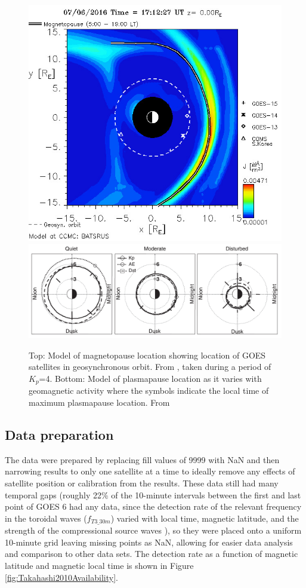 \begin{figure}[htp!]
	\centering
	\includegraphics[width=0.9\linewidth]{Figures/iSWACygnetStreamer.jpg}
	\includegraphics[width=0.9\linewidth]{Figures/PlasmapauseLocation.png}
	\caption{Top: Model of magnetopause location showing location of GOES satellites in geosynchronous orbit. From \citep{CCMC}, taken during a period of $K_p$=4. Bottom: Model of plasmapause location as it varies with geomagnetic activity where the symbols indicate the local time of maximum plasmapause location. From \citep{OBrien2003EmpiricalPlasmapause}}
	\label{fig:PlasmapauseLocation}
\end{figure}

\subsection{Data preparation}
The data were prepared by replacing fill values of 9999 with NaN and then narrowing results to only one satellite at a time to ideally remove any effects of satellite position or calibration from the results. These data still had many temporal gaps (roughly 22\% of the 10-minute intervals between the first and last point of GOES 6 had any data, since the detection rate of the relevant frequency in the toroidal waves ($f_{T3\_30m}$) varied with local time, magnetic latitude, and the strength of the compressional source waves \citep{Takahashi2010SolarCycleVariation}), so they were placed onto a uniform 10-minute grid leaving missing points as NaN, allowing for easier data analysis and comparison to other data sets. The detection rate as a function of magnetic latitude and magnetic local time is shown in Figure \ref{fig:Takahashi2010Availability}.

